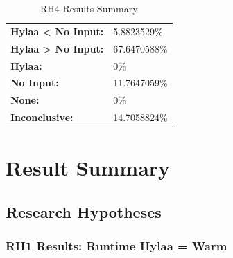 \documentclass{article}\usepackage[]{graphicx}\usepackage[]{color}
\begin{document}
	\begin{table}[H]
	\centering
	\caption{RH4 Results Summary}
	\begin{tabular}{ll}
	\textbf{Hylaa \textless{} No Input:}& 5.8823529\% \\
	\textbf{Hylaa \textgreater{} No Input:}& 67.6470588\%\\
	\textbf{Hylaa:} & 0\%\\
	\textbf{No Input:} & 11.7647059\%\\
	\textbf{None:}& 0\%\\
	\textbf{Inconclusive:}& 14.7058824\%
			
	
	\end{tabular}
	\end{table}
	
	
	



\section{Result Summary}
\subsection{Research Hypotheses}


	
	\subsubsection{RH1 Results: Runtime Hylaa = Warm}
	
\end{document}
